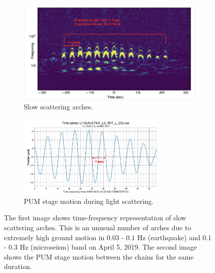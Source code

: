 \documentclass[12pt]{iopart}
\begin{document}
\begin{figure}[h]
   \centering
    \begin{subfigure}[b]{0.45\textwidth}
        \centering
         \includegraphics[width= \textwidth]{slowarch.png}
         \caption{Slow scattering arches.}
         \label{fig:slowscat}
    \end{subfigure}
    \hfill
    \begin{subfigure}[b]{0.5\textwidth}
        \centering
         \includegraphics[width =\textwidth,height=4cm]{tssus1.png}
         \caption{PUM stage motion during light scattering.}
         \label{fig:timeseriessus}
         
    
    \end{subfigure}
    \caption{The first image shows time-frequency representation of  slow scattering arches. This is an unusual number of arches due to extremely high ground motion in  $0.03$ - $0.1$ Hz (earthquake) and $0.1$ - $0.3$  Hz (microseism) band on April 5, 2019. The second image shows the PUM stage motion between the chains for the same duration.}
    \label{fig:slowscat_sus}
    
\end{figure}
\end{document}
